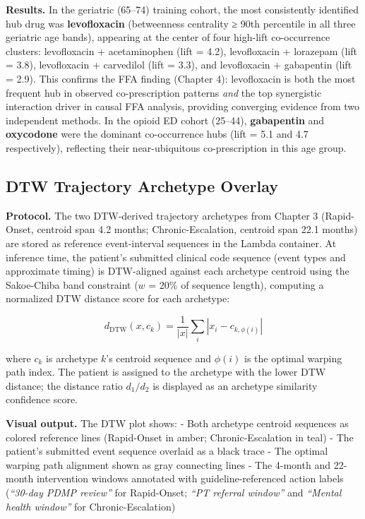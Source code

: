 \documentclass[
  12pt,
]{book}
\begin{document}
\textbf{Results.} In the geriatric (65--74) training cohort, the most
consistently identified hub drug was \textbf{levofloxacin} (betweenness
centrality ≥ 90th percentile in all three geriatric age bands),
appearing at the center of four high-lift co-occurrence clusters:
levofloxacin + acetaminophen (lift = 4.2), levofloxacin + lorazepam
(lift = 3.8), levofloxacin + carvedilol (lift = 3.3), and levofloxacin +
gabapentin (lift = 2.9). This confirms the FFA finding (Chapter 4):
levofloxacin is both the most frequent hub in observed co-prescription
patterns \emph{and} the top synergistic interaction driver in causal FFA
analysis, providing converging evidence from two independent methods. In
the opioid ED cohort (25--44), \textbf{gabapentin} and
\textbf{oxycodone} were the dominant co-occurrence hubs (lift = 5.1 and
4.7 respectively), reflecting their near-ubiquitous co-prescription in
this age group.

\subsection{DTW Trajectory Archetype
Overlay}\label{dtw-trajectory-archetype-overlay}

\textbf{Protocol.} The two DTW-derived trajectory archetypes from
Chapter 3 (Rapid-Onset, centroid span 4.2 months; Chronic-Escalation,
centroid span 22.1 months) are stored as reference event-interval
sequences in the Lambda container. At inference time, the patient's
submitted clinical code sequence (event types and approximate timing) is
DTW-aligned against each archetype centroid using the Sakoe-Chiba band
constraint (\(w\) = 20\% of sequence length), computing a normalized DTW
distance score for each archetype:

\[d_{\text{DTW}}(x, c_k) = \frac{1}{|x|} \sum_{i} |x_i - c_{k,\phi(i)}|\]

where \(c_k\) is archetype \(k\)'s centroid sequence and \(\phi(i)\) is
the optimal warping path index. The patient is assigned to the archetype
with the lower DTW distance; the distance ratio \(d_1 / d_2\) is
displayed as an archetype similarity confidence score.

\textbf{Visual output.} The DTW plot shows: - Both archetype centroid
sequences as colored reference lines (Rapid-Onset in amber;
Chronic-Escalation in teal) - The patient's submitted event sequence
overlaid as a black trace - The optimal warping path alignment shown as
gray connecting lines - The 4-month and 22-month intervention windows
annotated with guideline-referenced action labels (\emph{``30-day PDMP
review''} for Rapid-Onset; \emph{``PT referral window''} and
\emph{``Mental health window''} for Chronic-Escalation)
\end{document}
